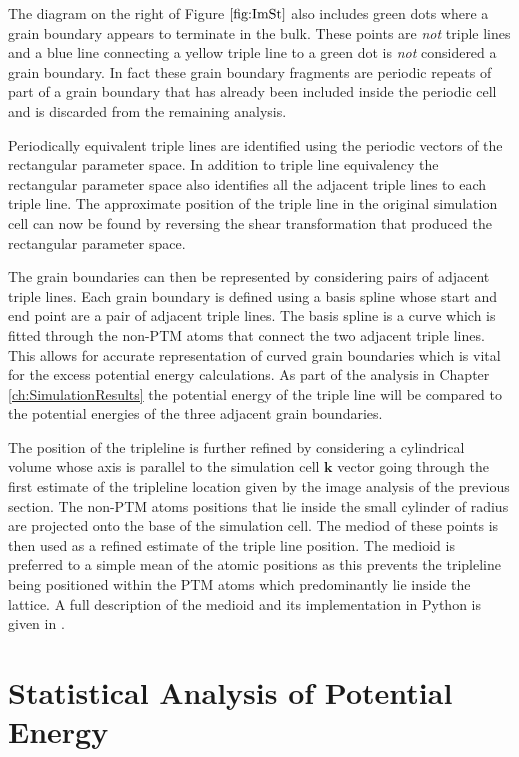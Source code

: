 \documentclass[12pt,a4paper,openany]{report}
\begin{document}
The diagram on the right of Figure $\ref{fig:ImSt}$ also includes green dots  where a grain boundary appears to terminate in the bulk. These points are \emph{not} triple lines and a blue line connecting a yellow triple line to a green dot is \emph{not} considered a grain boundary. In fact these grain boundary fragments are periodic repeats of part of a grain boundary that has already been included inside the periodic cell and is discarded from the remaining analysis.
 
Periodically equivalent triple lines are identified using the periodic vectors of the rectangular parameter space. In addition to triple line equivalency the rectangular parameter space also identifies all the adjacent triple lines to each triple line. 
The approximate position of the triple line in the original simulation cell can now be found by reversing the shear transformation that produced the rectangular parameter space.

The grain boundaries can then be represented by considering pairs of adjacent triple lines. Each grain boundary is defined using a basis spline whose start and end point are a pair of adjacent triple lines. The basis spline is a curve which is fitted through the non-PTM atoms that connect the two adjacent triple lines. This allows for accurate representation of curved grain boundaries which is vital for the excess potential energy calculations. As part of the analysis in Chapter \ref{ch:SimulationResults} the potential energy of the triple line will be compared to the potential energies of the three adjacent grain boundaries.  

The position of the tripleline is further refined by considering a cylindrical volume whose axis is parallel to the simulation cell $\mathbf{k}$ vector going through the first estimate of the tripleline location given by the image analysis of the previous section. The non-PTM atoms positions that lie inside the small cylinder of radius are projected onto the base of the simulation cell. The mediod of these points is then used as a refined estimate of the triple line position. The medioid is preferred to a simple mean of the atomic positions as this prevents the tripleline being positioned within the PTM atoms which predominantly lie inside the lattice. A full description of the medioid and its implementation in Python is given in \cite{Bauckhage2015}. 

\newpage
\section{Statistical Analysis of Potential Energy}
\end{document}
